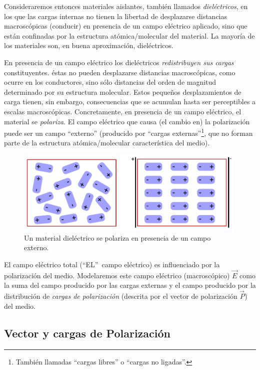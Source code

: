 Consideraremos entonces materiales aislantes, también llamados \textit{dieléctricos}, en los que las cargas internas no tienen la
libertad de desplazarse distancias macroscópicas (conducir) en presencia de un
campo eléctrico aplicado, sino que están confinadas por la estructura
atómica/molecular del material. La mayoría de los materiales son, en buena
aproximación, dieléctricos.

En presencia de un campo eléctrico los dieléctricos \textit{redistribuyen sus cargas} constituyentes. éstas no pueden desplazarse distancias macroscópicas,
como ocurre en los conductores, sino sólo distancias del orden de magnitud determinado por su estructura molecular.
Estos peque\~nos desplazamientos de carga tienen, sin embargo, consecuencias
que se acumulan hasta ser perceptibles a escalas macroscópicas.
Concretamente, en presencia de un campo eléctrico, el material
se \textit{polariza}.
El campo eléctrico que causa (el cambio en) la polarización puede ser un campo ``externo'' (producido por ``cargas externas''\footnote{También llamadas ``cargas libres'' o ``cargas no ligadas''.}, que no forman parte
de la estructura atómica/molecular característica del medio).
\begin{figure}[!h]
\centerline{\includegraphics[height=4cm]{fig/fig-dielectrico-01.pdf}}
\caption{Un material dieléctrico se polariza en presencia de un campo externo.}
\label{diel01}
\end{figure}

El campo eléctrico total (``EL''\, campo eléctrico) es influenciado por
la polarización del medio. Modelaremos este campo eléctrico
(macroscópico) $\vec{E}$ como la suma del campo
producido por las cargas externas y el campo producido por la distribución
de \textit{cargas de polarización} (descrita por el vector de polarización $\vec{P}$) del medio.

\subsection{Vector y cargas de Polarización}

